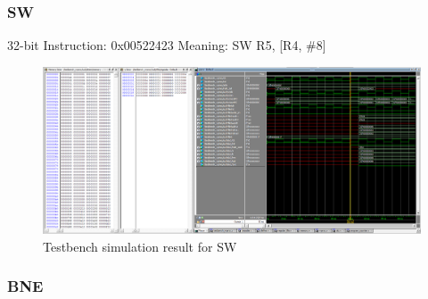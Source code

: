 \subsubsection*{SW}
\label{sect6_4_3_2e}

32-bit Instruction: 0x00522423 \newline
Meaning: SW R5, [R4, \#8]

\begin{figure}[h!]
\centering
\includegraphics[width=\linewidth]{figures/RISCV_Implementation_SW.PNG}
\caption{Testbench simulation result for SW}
\label{fig:riscv13}
\end{figure}

\subsubsection*{BNE}
\label{sect6_4_3_2f}





